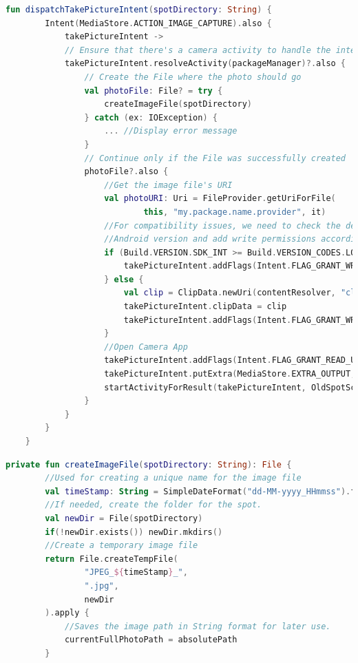 \begin{lstlisting}[caption={Starting the Camera}, label={lst:dispatchTakePictureIntent}, language=Kotlin]
fun dispatchTakePictureIntent(spotDirectory: String) {
        Intent(MediaStore.ACTION_IMAGE_CAPTURE).also {
            takePictureIntent ->
            // Ensure that there's a camera activity to handle the intent
            takePictureIntent.resolveActivity(packageManager)?.also {
                // Create the File where the photo should go
                val photoFile: File? = try {
                    createImageFile(spotDirectory)
                } catch (ex: IOException) {
                    ... //Display error message
                }
                // Continue only if the File was successfully created
                photoFile?.also {
                    //Get the image file's URI
                    val photoURI: Uri = FileProvider.getUriForFile(
                            this, "my.package.name.provider", it)
                    //For compatibility issues, we need to check the device's
                    //Android version and add write permissions accordingly.
                    if (Build.VERSION.SDK_INT >= Build.VERSION_CODES.LOLLIPOP) {
                        takePictureIntent.addFlags(Intent.FLAG_GRANT_WRITE_URI_PERMISSION)
                    } else {
                        val clip = ClipData.newUri(contentResolver, "clipData", photoURI)
                        takePictureIntent.clipData = clip
                        takePictureIntent.addFlags(Intent.FLAG_GRANT_WRITE_URI_PERMISSION)
                    }
                    //Open Camera App
                    takePictureIntent.addFlags(Intent.FLAG_GRANT_READ_URI_PERMISSION)
                    takePictureIntent.putExtra(MediaStore.EXTRA_OUTPUT, photoURI)
                    startActivityForResult(takePictureIntent, OldSpotScreen.REQUEST_TAKE_PHOTO)
                }
            }
        }
    }
\end{lstlisting}



\begin{lstlisting}[caption={Creating an Image File}, label={lst:createImageFile}, language=Kotlin]
private fun createImageFile(spotDirectory: String): File {
        //Used for creating a unique name for the image file
        val timeStamp: String = SimpleDateFormat("dd-MM-yyyy_HHmmss").format(Date()) 
        //If needed, create the folder for the spot.
        val newDir = File(spotDirectory)
        if(!newDir.exists()) newDir.mkdirs()
        //Create a temporary image file
        return File.createTempFile(
                "JPEG_${timeStamp}_",
                ".jpg",
                newDir
        ).apply {
            //Saves the image path in String format for later use.
            currentFullPhotoPath = absolutePath
        }
\end{lstlisting}

